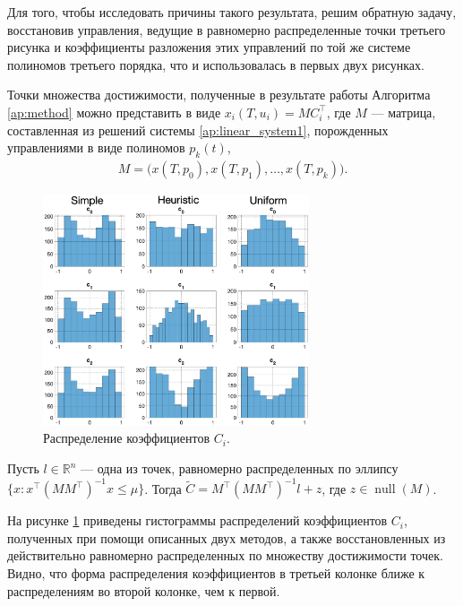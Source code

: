 \documentclass[../main.tex]{subfiles}
\begin{document}
 Для того, чтобы исследовать причины такого результата, решим обратную задачу, восстановив управления, ведущие в равномерно распределенные точки третьего рисунка и коэффициенты разложения этих управлений по той же системе полиномов третьего порядка, что и использовалась в первых двух рисунках.
 
 Точки множества достижимости, полученные в результате работы Алгоритма \ref{ap:method} можно представить в виде $x_i(T, u_i) = M C_i^{\top}$, где $M$ --- матрица, составленная из решений системы \eqref{ap:linear_system1}, порожденных управлениями в виде полиномов $p_k(t)$, 
 \begin{gather}\label{ap:matrix_M}
 	 M = \big(x(T, p_0), x(T, p_1), \dots, x(T, p_k)\big).
 \end{gather} 
 
 \begin{figure}[ht]
 	\centering
 	\includegraphics[width=0.7\textwidth]{images/three_coefficients_distribution.eps}
 	\caption{Распределение коэффициентов $C_i$.}
 	\label{fig:ap:three_coefficients_distribution}
 \end{figure}
 
 Пусть $l\in \mathbb{R}^{n}$ --- одна из точек, равномерно распределенных по эллипсу $\{x: x^{\top} (M M^{\top})^{-1} x \leqslant \mu \}$.
 Тогда $\widetilde{C} = M^{\top} (M M^{\top})^{-1} l + z$, где $z \in \operatorname{null}(M)$.
 
 На рисунке \ref{fig:ap:three_coefficients_distribution} приведены гистограммы распределений коэффициентов $C_i$, полученных при помощи описанных двух методов, а также восстановленных из действительно равномерно распределенных по множеству достижимости точек. 
 Видно, что форма распределения коэффициентов в третьей колонке ближе к распределениям во второй колонке, чем к первой. 
 
\end{document}
